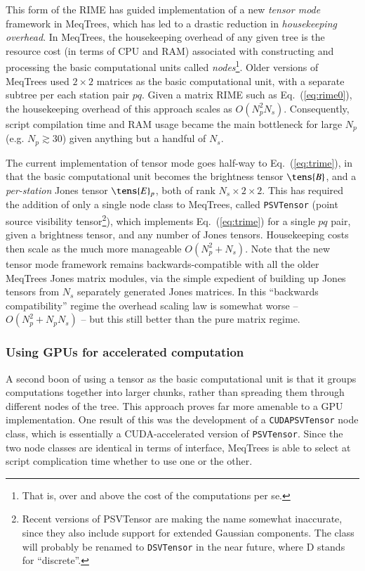 \documentclass{aa}
\begin{document}
This form of the RIME has guided implementation of a new {\em tensor mode} framework in MeqTrees, which has led to a drastic reduction in {\em housekeeping overhead}. In MeqTrees, the housekeeping overhead of any given tree is the resource cost (in terms of CPU and RAM) associated with constructing and processing the basic computational units called {\em nodes}\footnote{That is, over and above the cost of the computations per se.}. Older versions of MeqTrees used $2\times2$ matrices as the basic computational unit, with a separate subtree per each station pair $pq$. Given a matrix RIME such as Eq.~(\ref{eq:rime0}), the housekeeping overhead of this approach scales as $O(N_p^2 N_s)$. Consequently, script compilation time and RAM usage became the main bottleneck for large $N_p$ (e.g. $N_p\gtrsim 30$) given anything but a handful of $N_s$.

The current implementation of tensor mode goes half-way to Eq.~(\ref{eq:trime}), in that the basic computational unit becomes the brightness tensor $\tens{B}$, and a \emph{per-station} Jones tensor $\tens{E}_p$, both of rank $N_s\times2\times2$. This has required the addition of only a single node class to MeqTrees, called {\tt PSVTensor} (point source visibility tensor\footnote{Recent versions of PSVTensor are making the name somewhat inaccurate, since they also include support for extended Gaussian components. The class will probably be renamed to {\tt DSVTensor} in the near future, where D stands for ``discrete''.}), which implements Eq.~(\ref{eq:trime}) for a single $pq$ pair, given a brightness tensor, and any number of Jones tensors. Housekeeping costs then scale as the much more manageable $O(N_p^2+N_s)$. Note that the new tensor mode framework remains backwards-compatible with all the older MeqTrees Jones matrix modules, via the simple expedient of building up Jones tensors from $N_s$ separately generated Jones matrices. In this ``backwards compatibility'' regime the overhead scaling law is somewhat worse --  $O(N_p^2+N_p N_s)$ -- but this still better than the pure matrix regime. 

\subsubsection{Using GPUs for accelerated computation}

A second boon of using a tensor as the basic computational unit is that it groups computations together into larger chunks, rather than spreading them through different nodes of the tree. This approach proves far more amenable to a GPU implementation. One result of this was the development of a {\tt CUDAPSVTensor} node class, which is essentially a CUDA-accelerated version of {\tt PSVTensor}. Since the two node classes are identical in terms of interface, MeqTrees is able to select at script complication time whether to use one or the other.
\end{document}
